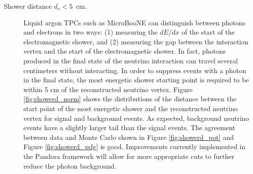 \begin{description}

\item[Shower distance $d_{s} < 5$~cm.] Liquid argon TPCs such as MicroBooNE can distinguish between photons and electrons in two ways: (1) measuring the $dE/dx$ of the start of the electromagnetic shower, and (2) measuring the gap between the interaction vertex and the start of the electromagnetic shower. In fact, photons produced in the final state of the neutrino interaction can travel several centimeters without interacting. In order to suppress events with a photon in the final state, the most energetic shower starting point is required to be within 5 cm of the reconstructed neutrino vertex.
Figure \ref{fig:showerd_norm} shows the distributions of the distance between the start point of the most energetic shower and the reconstructed neutrino vertex for signal and background events. As expected, background neutrino events have a slightly larger tail than the signal events. The agreement between data and Monte Carlo shown in Figure \ref{fig:showerd_pot} {and Figure \ref{fig:showerd_pdg}} is good. Improvements currently implemented in the Pandora framework will allow for more appropriate cuts to further reduce the photon background.


\end{description}
